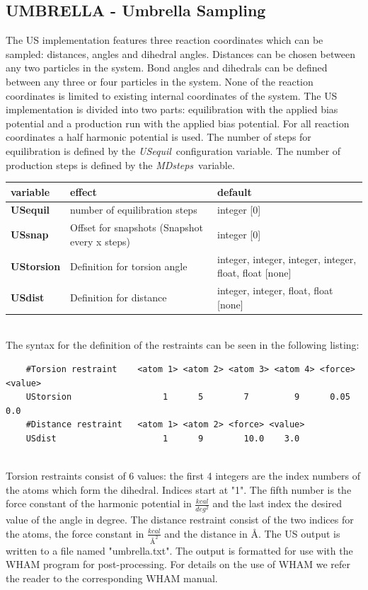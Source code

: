 \documentclass[10pt,a4paper]{article} %
\begin{document}
	\subsection{UMBRELLA - Umbrella Sampling}
	The \acf{US}\supercite{umbrellasampling1, umbrellasampling2, umbrellasamplingreview} implementation features three reaction coordinates which can be sampled: distances, angles and dihedral angles. Distances can be chosen between any two particles in the system. Bond angles and dihedrals can be defined between any three or four particles in the system. None of the reaction coordinates is limited to existing internal coordinates of the system.
	The \acl{US} implementation is divided into two parts: equilibration with the applied bias potential and a production run with the applied bias potential. For all reaction coordinates a half harmonic potential is used. The number of steps for equilibration is defined by the \glqq\textit{USequil}\grqq~configuration variable. The number of production steps is defined by the \glqq\textit{MDsteps}\grqq~variable.

	\begin{tabularx}{\textwidth}{l|X|X}
		variable & effect & default \\
		\hline
		\textbf{USequil} & number of equilibration steps & integer [0] \\
		\textbf{USsnap} & Offset for snapshots (Snapshot every x steps) & integer [0]  \\
		\textbf{UStorsion} & Definition for torsion angle & integer, integer, integer, integer, float, float [none] \\
		\textbf{USdist} & Definition for distance & integer, integer, float, float [none] \\
	\end{tabularx}~\\

	The syntax for the definition of the restraints can be seen in the following listing:\\

	\begin{lstlisting}
	#Torsion restraint    <atom 1> <atom 2> <atom 3> <atom 4> <force> <value>
	UStorsion                  1      5        7         9      0.05    0.0
	#Distance restraint   <atom 1> <atom 2> <force> <value>
	USdist                     1      9        10.0    3.0
	\end{lstlisting}
	~\\
	Torsion restraints consist of 6 values: the first 4 integers are the index numbers of the atoms which form the dihedral. Indices start at "1". The fifth number is the force constant of the harmonic potential in $\frac{kcal}{deg^2}$ and the last index the desired value of the angle in degree.
	The distance restraint consist of the two indices for the atoms, the force constant in $\frac{kcal}{Å^2}$ and the distance in Å.
	The \acl{US} output is written to a file named "umbrella.txt". The output is formatted for use with the \ac{WHAM} program\supercite{wham1, wham2} for post-processing. For details on the use of WHAM we refer the reader to the corresponding \ac{WHAM} manual.
\end{document}
